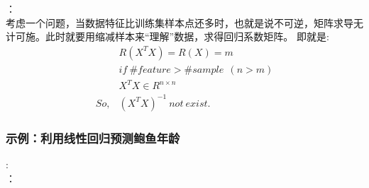 ：\\
考虑一个问题，当数据特征比训练集样本点还多时，也就是说不可逆，矩阵求导无计可施。此时就要用缩减样本来“理解”数据，求得回归系数矩阵。
即就是:
\begin{equation}\nonumber
\begin{split}
  &R(X^TX)=R(X)=m\\
  &if~\#feature>\#sample ~~(n>m)\\
  &X^TX\in R^{n\times n}\\
  So,&(X^TX)^{-1}~not~exist.
\end{split}
\end{equation}

\subsubsection{示例：利用线性回归预测鲍鱼年龄}
:\\
：
